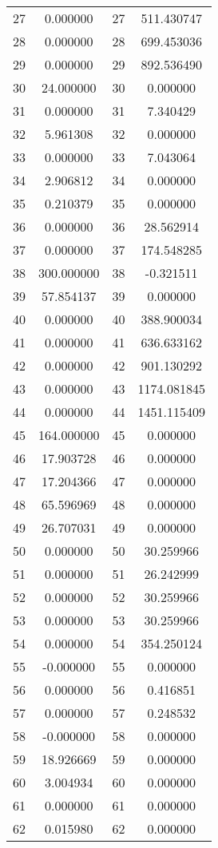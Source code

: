\documentclass[12pt]{article}
\begin{document}
\begin{longtable}{@{}cccc@{}}
27 & 0.000000 & 27 & 511.430747 \\
28 & 0.000000 & 28 & 699.453036 \\
29 & 0.000000 & 29 & 892.536490 \\
30 & 24.000000 & 30 & 0.000000 \\
31 & 0.000000 & 31 & 7.340429 \\
32 & 5.961308 & 32 & 0.000000 \\
33 & 0.000000 & 33 & 7.043064 \\
34 & 2.906812 & 34 & 0.000000 \\
35 & 0.210379 & 35 & 0.000000 \\
36 & 0.000000 & 36 & 28.562914 \\
37 & 0.000000 & 37 & 174.548285 \\
38 & 300.000000 & 38 & -0.321511 \\
39 & 57.854137 & 39 & 0.000000 \\
40 & 0.000000 & 40 & 388.900034 \\
41 & 0.000000 & 41 & 636.633162 \\
42 & 0.000000 & 42 & 901.130292 \\
43 & 0.000000 & 43 & 1174.081845 \\
44 & 0.000000 & 44 & 1451.115409 \\
45 & 164.000000 & 45 & 0.000000 \\
46 & 17.903728 & 46 & 0.000000 \\
47 & 17.204366 & 47 & 0.000000 \\
48 & 65.596969 & 48 & 0.000000 \\
49 & 26.707031 & 49 & 0.000000 \\
50 & 0.000000 & 50 & 30.259966 \\
51 & 0.000000 & 51 & 26.242999 \\
52 & 0.000000 & 52 & 30.259966 \\
53 & 0.000000 & 53 & 30.259966 \\
54 & 0.000000 & 54 & 354.250124 \\
55 & -0.000000 & 55 & 0.000000 \\
56 & 0.000000 & 56 & 0.416851 \\
57 & 0.000000 & 57 & 0.248532 \\
58 & -0.000000 & 58 & 0.000000 \\
59 & 18.926669 & 59 & 0.000000 \\
60 & 3.004934 & 60 & 0.000000 \\
61 & 0.000000 & 61 & 0.000000 \\
62 & 0.015980 & 62 & 0.000000 \\

\end{longtable}
\end{document}
